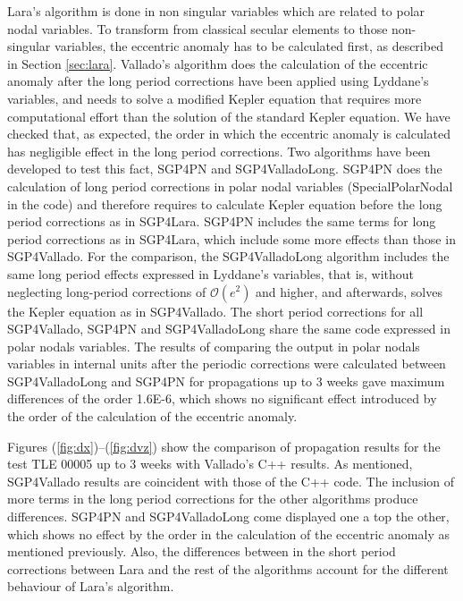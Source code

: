 \documentclass{article}
\begin{document}
Lara's algorithm is done in non singular variables which are related to polar nodal variables.
To transform from classical secular elements to those non-singular variables, the eccentric anomaly has to be calculated first, {\color{red} as described in Section \ref{sec:lara}}.
Vallado's algorithm does the calculation of the eccentric anomaly after the long period corrections have been applied using Lyddane's variables, {\color{red} and needs to solve a modified Kepler equation that requires more computational effort than the solution of the standard Kepler equation}.
We have checked that, {\color{red}as expected}, the order in which the eccentric anomaly is calculated has negligible effect in the long period corrections.
Two algorithms have been developed to test this fact, SGP4PN and SGP4ValladoLong.
SGP4PN does the calculation of long period corrections in polar nodal variables (SpecialPolarNodal in the code) and therefore requires
to calculate Kepler equation before the long period corrections as in SGP4Lara. SGP4PN includes the same terms for long period corrections as in SGP4Lara,
which include some more effects than those in SGP4Vallado. For the comparison, the SGP4ValladoLong algorithm includes the same long period effects expressed
in Lyddane's variables, {\color{red} that is, without neglecting long-period corrections of $\mathcal{O}(e^2)$ and higher}, and afterwards, solves the Kepler equation as in SGP4Vallado.
The short period corrections for all SGP4Vallado, SGP4PN and SGP4ValladoLong share the same code expressed in polar nodals variables.
The results of comparing the output in polar nodals variables in internal units after the periodic corrections were calculated between SGP4ValladoLong and SGP4PN for propagations up to 3 weeks
gave maximum differences of the order 1.6E-6, which shows no significant effect introduced by the order of the calculation of the eccentric anomaly.

Figures (\ref{fig:dx})--(\ref{fig:dvz}) show the comparison of propagation results for the test TLE 00005 up to 3 weeks with Vallado's C++ results.
As mentioned, SGP4Vallado results are coincident with those of the C++ code.
The inclusion of more terms in the long period corrections for the other algorithms produce differences.
SGP4PN and SGP4ValladoLong come displayed one a top the other, which shows no effect by the order in the calculation of the eccentric anomaly as mentioned previously.
Also, the differences between in the short period corrections between Lara and the rest of the algorithms account for the different behaviour of Lara's algorithm.
\end{document}
